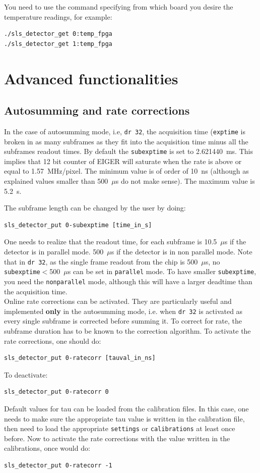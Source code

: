 \documentclass{article}
\newcommand{\E}{EIGER\xspace}
\begin{document}
You need to use the command specifying from which board you desire the temperature readings, for example:
\begin{verbatim}
./sls_detector_get 0:temp_fpga
./sls_detector_get 1:temp_fpga
\end{verbatim}

\section{Advanced functionalities}
\subsection{Autosumming and rate corrections}

In the case of autosumming mode, i.e, {\tt{dr 32}}, the acquisition time ({\tt{exptime}} is broken in as many subframes as they fit into the acquisition time minus all the subframes readout times. By default the {\tt{subexptime}} is set to 2.621440~ms. This implies that 12 bit counter of \E will saturate when the rate is above or equal to 1.57~MHz/pixel. The minimum value is of order of 10~ns (although as explained values smaller than 500~$\mu$s do not make sense). The maximum value is 5.2~s.

The subframe length can be changed by the user by doing: 
\begin{verbatim}
sls_detector_put 0-subexptime [time_in_s] 
\end{verbatim}

One needs to realize that the readout time, for each subframe is 10.5~$\mu$s if the detector is in parallel mode. 500~$\mu$s if the detector is in non parallel mode. Note that in {\tt{dr 32}}, as the single frame readout from the chip is 500~$\mu$s, no {\tt{subexptime}}$<$500~$\mu$s can be set in {\tt{parallel}} mode. To have smaller {\tt{subexptime}}, you need the {\tt{nonparallel}} mode, although this will have a larger deadtime than the acquisition time.\\

Online rate corrections can be activated. They are particularly useful and implemented \textbf{only} in the autosumming mode, i.e. when {\tt{dr 32}} is activated as  every single subframe is corrected before summing it. To correct for rate, the subframe duration has to be known to the correction algorithm.    
To activate the rate corrections, one should do:\\
\begin{verbatim}
sls_detector_put 0-ratecorr [tauval_in_ns]
\end{verbatim}
To deactivate:
\begin{verbatim}
sls_detector_put 0-ratecorr 0
\end{verbatim}
Default values for tau can be loaded from the calibration files. In this case, one needs to make sure the appropriate tau value is written in the calibration file, then need to load the appropriate {\tt{settings}} or {\tt{calibrations}} at least once before. Now to activate the rate corrections with the value written in the calibrations, once would do: 
\begin{verbatim}
sls_detector_put 0-ratecorr -1
\end{verbatim}
\end{document}
